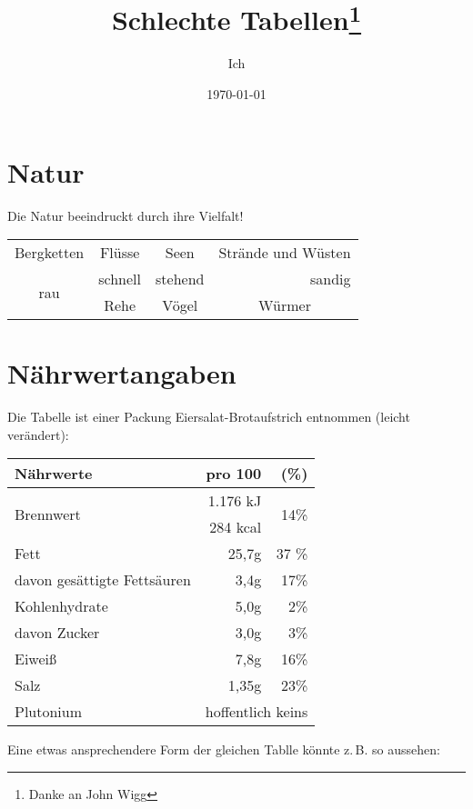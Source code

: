 \documentclass[a4paper, 10pt,onecolumn]{scrartcl}
\title{Schlechte Tabellen\thanks{Danke an John Wigg}}
\author{Ich} %
\date{\today}
\begin{document}
\tableofcontents
\maketitle

\section{Natur}
Die Natur beeindruckt durch ihre Vielfalt!\\

\begin{center}
	\begin{tabular}{|c|c|c|c|}
		\hline
		Bergketten & Flüsse & Seen & Strände und Wüsten\\
		\cline{1-3}
		\multirow{2}{*}{rau}   &  schnell & stehend & \multicolumn{1}{|r|}{sandig}       \\
		\cline{2-4}
		& Rehe & Vögel & Würmer\\
		\hline
	\end{tabular}
\end{center}

\section{Nährwertangaben}
Die Tabelle ist einer Packung Eiersalat-Brotaufstrich entnommen (leicht verändert):

\begin{center}
\begin{tabular}{|l|r|r|}
	\hline
	\textbf{Nährwerte} & \textbf{pro 100} & \textbf{(\%)}\footnotemark[1]\\
	\hline
	\multirow{2}{*}{Brennwert} & 1.176 kJ & \multirow{2}{*}{14\%} \\
	& 284 kcal & \\
	\hline 
	Fett & 25,7g & 37 \% \\
	davon gesättigte Fettsäuren & 3,4g & 17\% \\
	\hline
	Kohlenhydrate & 5,0g & 2\% \\
	davon Zucker & 3,0g & 3\% \\
	\hline
	Eiweiß & 7,8g & 16\% \\
	\hline
	Salz & 1,35g & 23\%\\ \hline
	Plutonium & \multicolumn{2}{c|}{hoffentlich keins}\\
	\hline

\end{tabular}
\end{center}
\newpage
Eine etwas ansprechendere Form der gleichen Tablle könnte z.\,B. so aussehen:
\end{document}
